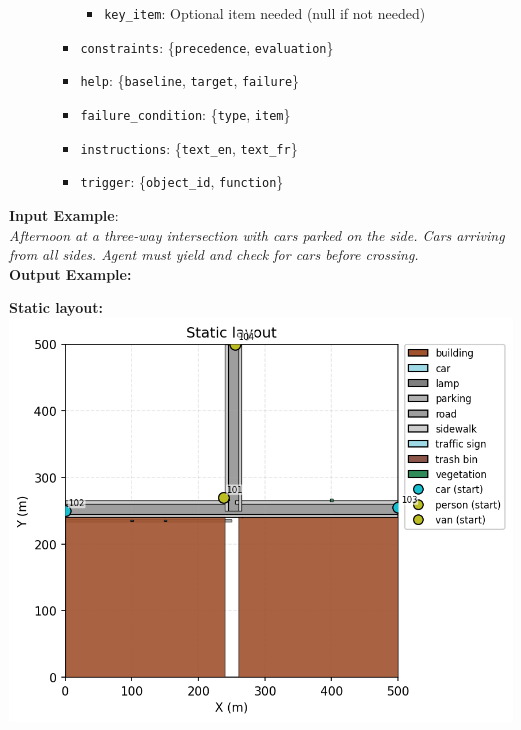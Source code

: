 \documentclass{article}
\begin{document}
\begin{tcolorbox}[examplebox, title=Scene Specification Format]
\begin{itemize}
\begin{itemize}
\begin{itemize}
\begin{itemize}
                \item \texttt{key\_item}: Optional item needed (null if not needed)
            \end{itemize}
            \item \texttt{constraints}: \{\texttt{precedence}, \texttt{evaluation}\}
            \item \texttt{help}: \{\texttt{baseline}, \texttt{target}, \texttt{failure}\}
            \item \texttt{failure\_condition}: \{\texttt{type}, \texttt{item}\}
            \item \texttt{instructions}: \{\texttt{text\_en}, \texttt{text\_fr}\}
            \item \texttt{trigger}: \{\texttt{object\_id}, \texttt{function}\}
        \end{itemize}
    \end{itemize}
\end{itemize}
\vspace{1em}

\textbf{Input Example}: \\

\emph{Afternoon at a three-way intersection with cars parked on the side. Cars arriving from all sides. Agent must yield and check for cars before crossing.}\\


\noindent\textbf{Output Example:}

\textbf{Static layout:}\\
\includegraphics[width=0.8\linewidth]{images/gemini_static.png}


\vspace{1em}


\end{tcolorbox}
\end{document}
